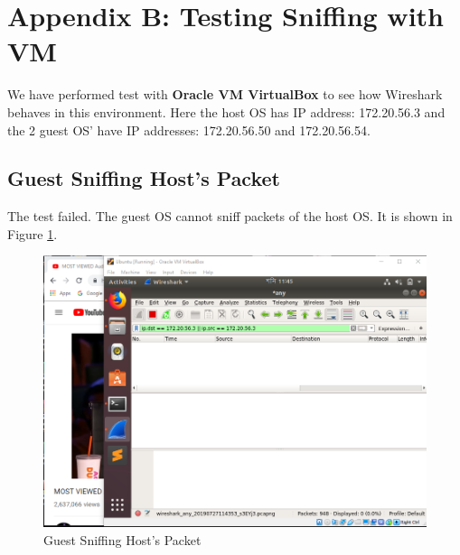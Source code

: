 \documentclass[14pt]{extarticle}
\begin{document}
\section{Appendix B: Testing Sniffing with VM}
    \label{apx:test_wireshark}
    We have performed test with \textbf{Oracle VM VirtualBox} to see how Wireshark behaves in this environment. Here the host OS has IP address: 172.20.56.3 and the 2 guest OS' have IP addresses: 172.20.56.50 and 172.20.56.54. 
    
    \subsection{Guest Sniffing Host's Packet}
        The test failed. The guest OS cannot sniff packets of the host OS. It is shown in Figure \ref{fig:vm2main}.
        \begin{figure}
            \centering
            \includegraphics[width=.95\textwidth]{Pictures/VM1_to_main.png}
            \caption{Guest Sniffing Host's Packet}
            \label{fig:vm2main}
        \end{figure}
    
\end{document}
